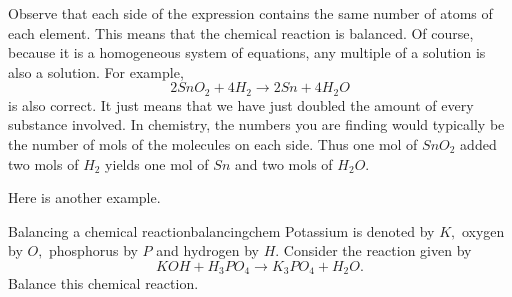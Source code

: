 Observe that each side of the expression contains the same number of
atoms of each element. This means that the chemical reaction is
balanced. Of course, because it is a homogeneous system of equations, any
multiple of a solution is also a solution. For example,
\begin{equation*}
2SnO_{2}+4H_{2}\rightarrow 2Sn+4H_{2}O
\end{equation*}
is also correct. It just means that we have just doubled the amount of
every substance involved. In chemistry, the numbers you are finding
would typically be the number of mols of the molecules on each
side. Thus one mol of $SnO_2$ added two mols of $H_2$ yields one mol
of $Sn$ and two mols of $H_2O$.


Here is another example.

\begin{example}{Balancing a chemical reaction}{balancingchem}
Potassium is denoted by $K,$ oxygen by $O,$
phosphorus by $P$ and hydrogen by $H$. 
Consider the reaction given by
\begin{equation*}
KOH+H_{3}PO_{4}\rightarrow K_{3}PO_{4}+H_{2}O.
\end{equation*}
Balance this chemical reaction.
\end{example}

